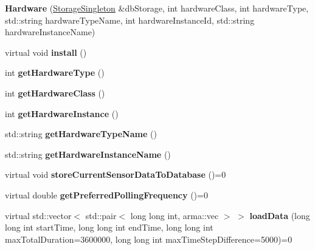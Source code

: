 \begin{DoxyCompactItemize}
\item 
{\bfseries Hardware} (\hyperlink{classkukadu_1_1StorageSingleton}{Storage\+Singleton} \&db\+Storage, int hardware\+Class, int hardware\+Type, std\+::string hardware\+Type\+Name, int hardware\+Instance\+Id, std\+::string hardware\+Instance\+Name)\hypertarget{classkukadu_1_1Hardware_af7a1355a6d8c10e68b7bfd783bc9d8a2}{}\label{classkukadu_1_1Hardware_af7a1355a6d8c10e68b7bfd783bc9d8a2}

\item 
virtual void {\bfseries install} ()\hypertarget{classkukadu_1_1Hardware_a694ca4d7b1cb52b17d2bdb8a4c64d16c}{}\label{classkukadu_1_1Hardware_a694ca4d7b1cb52b17d2bdb8a4c64d16c}

\item 
int {\bfseries get\+Hardware\+Type} ()\hypertarget{classkukadu_1_1Hardware_a34e793c453fe444d98905f7a64d1720b}{}\label{classkukadu_1_1Hardware_a34e793c453fe444d98905f7a64d1720b}

\item 
int {\bfseries get\+Hardware\+Class} ()\hypertarget{classkukadu_1_1Hardware_a33e1b7ba05ccb5f7b9f9f7c9455efa4e}{}\label{classkukadu_1_1Hardware_a33e1b7ba05ccb5f7b9f9f7c9455efa4e}

\item 
int {\bfseries get\+Hardware\+Instance} ()\hypertarget{classkukadu_1_1Hardware_a7739a3df264205b2587f37c1828c8fb6}{}\label{classkukadu_1_1Hardware_a7739a3df264205b2587f37c1828c8fb6}

\item 
std\+::string {\bfseries get\+Hardware\+Type\+Name} ()\hypertarget{classkukadu_1_1Hardware_a1353994ae509caf0e5c8d5f112d82e66}{}\label{classkukadu_1_1Hardware_a1353994ae509caf0e5c8d5f112d82e66}

\item 
std\+::string {\bfseries get\+Hardware\+Instance\+Name} ()\hypertarget{classkukadu_1_1Hardware_a994090c6bf74f03a91a44df6eeb41703}{}\label{classkukadu_1_1Hardware_a994090c6bf74f03a91a44df6eeb41703}

\item 
virtual void {\bfseries store\+Current\+Sensor\+Data\+To\+Database} ()=0\hypertarget{classkukadu_1_1Hardware_aa5f6000a535e8307d78384c6fb1fe2e3}{}\label{classkukadu_1_1Hardware_aa5f6000a535e8307d78384c6fb1fe2e3}

\item 
virtual double {\bfseries get\+Preferred\+Polling\+Frequency} ()=0\hypertarget{classkukadu_1_1Hardware_ad51f511da20c43db040e0f34e50eba51}{}\label{classkukadu_1_1Hardware_ad51f511da20c43db040e0f34e50eba51}

\item 
virtual std\+::vector$<$ std\+::pair$<$ long long int, arma\+::vec $>$ $>$ {\bfseries load\+Data} (long long int start\+Time, long long int end\+Time, long long int max\+Total\+Duration=3600000, long long int max\+Time\+Step\+Difference=5000)=0\hypertarget{classkukadu_1_1Hardware_a4ea17ba6cb91d1a5f53e5b2c96c0cd8c}{}\label{classkukadu_1_1Hardware_a4ea17ba6cb91d1a5f53e5b2c96c0cd8c}

\end{DoxyCompactItemize}
